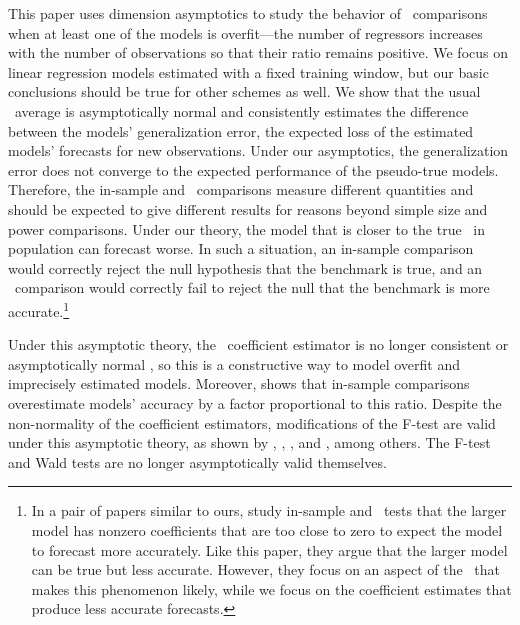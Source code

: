 \documentclass[11pt]{article}
\begin{document}
This paper uses dimension asymptotics to study the behavior of \oos\
comparisons when at least one of the models is overfit---the number of
regressors increases with the number of observations so that their
ratio remains positive.  We focus on linear regression models
estimated with a fixed training window, but our basic conclusions
should be true for other schemes as well.  We show that the usual
\oos\ average is asymptotically normal and consistently estimates the
difference between the models' generalization error, the expected loss
of the estimated models' forecasts for new observations.  Under our
asymptotics, the generalization error does not converge to the
expected performance of the pseudo-true models.  Therefore, the
in-sample and \oos\ comparisons measure different quantities and
should be expected to give different results for reasons beyond simple
size and power comparisons.  Under our theory, the model that is
closer to the true \dgp\ in population can forecast worse.  In such a
situation, an in-sample comparison would correctly reject the null
hypothesis that the benchmark is true, and an \oos\ comparison would
correctly fail to reject the null that the benchmark is more
accurate.\footnote{In a pair of papers similar to ours,
  \citet{RePEc:fip:fedkrw:rwp09-10,RePEc:fip:fedkrw:rwp09-11} study
  in-sample and \oos\ tests that the larger model has nonzero
  coefficients that are too close to zero to expect the model to
  forecast more accurately.  Like this paper, they argue that the
  larger model can be true but less accurate.  However, they focus on
  an aspect of the \dgp\ that makes this phenomenon likely, while we
  focus on the coefficient estimates that produce less accurate
  forecasts.}

Under this asymptotic theory, the \ols\ coefficient estimator is no longer
consistent or asymptotically normal \citep{huber_robust_1973}, so this
is a constructive way to model overfit and imprecisely estimated
models.  Moreover, \citet{efron_biased_1986,efron_estimation_2004}
shows that in-sample comparisons overestimate models' accuracy by a
factor proportional to this ratio.  Despite the non-normality of the
coefficient estimators, modifications of the F-test are valid
under this asymptotic theory, as shown by \citet{boos_anova_1995},
\citet{akritas_asymptotics_2000},
\citet{akritas_heteroscedastic_2004}, and
\citet{calhoun_hypothesis_2009}, among others.  The F-test and Wald
tests are no longer asymptotically valid themselves.
\end{document}
